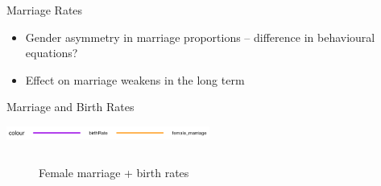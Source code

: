 \documentclass{beamer}
\begin{document}
\begin{frame}{Marriage Rates}
			\begin{itemize}
				\item Gender asymmetry in marriage proportions -- difference in behavioural equations?
				\item Effect on marriage weakens in the long term
			\end{itemize}
		\end{frame}

		\begin{frame}{Marriage and Birth Rates}
			\begin{center}
				\includegraphics[width=0.5\textwidth]{Images/legend2.png}
			\end{center}

			\begin{columns}
				\begin{column}{0.5\paperwidth}
					\begin{figure}
						\caption{Female marriage + birth rates}
					\end{figure}
				\end{column}


\end{columns}
\end{frame}
\end{document}
